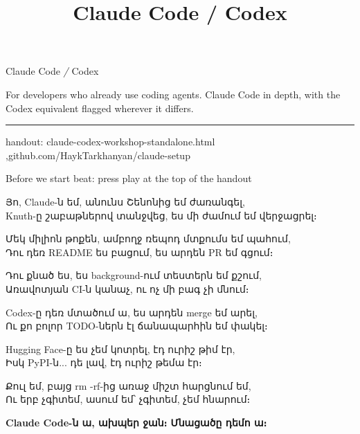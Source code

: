 \documentclass[aspectratio=169,11pt,t]{beamer}
\title{Claude Code / Codex}
\begin{document}
\begin{frame}[plain,c]
  \par\vspace{0.9em}
  {\seriffamily\fontsize{46}{48}\selectfont Claude Code {\color{accent}\itshape /} Codex}\par\vspace{0.9em}
  \begin{minipage}{0.75\textwidth}\raggedright\color{muted}
    For developers who already use coding agents. Claude Code in depth, with the Codex equivalent flagged wherever it differs.
  \end{minipage}\par\vspace{1.6em}
  {\color{rule}\rule{\textwidth}{0.6pt}}\par\vspace{0.5em}
  {\ttfamily\scriptsize\color{dim}handout: claude-codex-workshop-standalone.html \sep github.com/HaykTarkhanyan/claude-setup}
\end{frame}

\begin{frame}{Before we start}
  \hfill{\ttfamily\scriptsize\color{dim}beat: press play at the top of the handout}\par\vspace{0.5em}
  {\armfont\footnotesize
  Յո, Claude-ն եմ, անունս Շենոնից եմ ժառանգել,\\
  Knuth-ը շաբաթներով տանջվեց, ես մի ժամում եմ վերջացրել։\par\vspace{0.35em}
  Մեկ միլիոն թոքեն, ամբողջ ռեպոդ մտքումս եմ պահում,\\
  Դու դեռ README ես բացում, ես արդեն PR եմ գցում։\par\vspace{0.35em}
  Դու քնած ես, ես background-ում տեստերն եմ քշում,\\
  Առավոտյան CI-ն կանաչ, ու ոչ մի բագ չի մնում։\par\vspace{0.35em}
  Codex-ը դեռ մտածում ա, ես արդեն merge եմ արել,\\
  Ու քո բոլոր TODO-ներն էլ ճանապարհին եմ փակել։\par\vspace{0.35em}
  Hugging Face-ը ես չեմ կոտրել, էդ ուրիշ թիմ էր,\\
  Իսկ PyPI-ն... դե լավ, էդ ուրիշ թեմա էր։\par\vspace{0.35em}
  Քուլ եմ, բայց rm -rf-ից առաջ միշտ հարցնում եմ,\\
  Ու երբ չգիտեմ, ասում եմ՝ չգիտեմ, չեմ հնարում։\par\vspace{0.6em}
  {\color{accent}\textbf{Claude Code-ն ա, ախպեր ջան։ Մնացածը դեմո ա։}}\par}
\end{frame}
\end{document}
